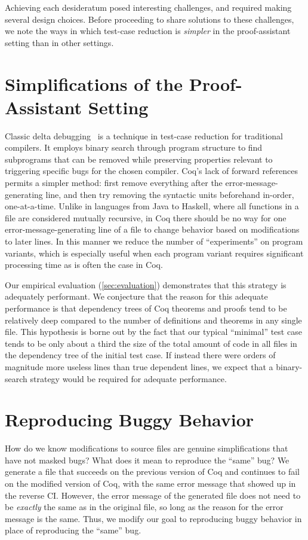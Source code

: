 \documentclass[a4paper,USenglish,cleveref,autoref,thm-restate]{lipics-v2021}
\begin{document}
Achieving each desideratum posed interesting challenges, and required making several design choices.
Before proceeding to share solutions to these challenges, we note the ways in which test-case reduction is \emph{simpler} in the proof-assistant setting than in other settings.


\section{Simplifications of the Proof-Assistant Setting}\label{sec:easier}

Classic delta debugging~\cite{Zeller2002} is a technique in test-case reduction for traditional compilers.
It employs binary search through program structure to find subprograms that can be removed while preserving properties relevant to triggering specific bugs for the chosen compiler.
Coq's lack of forward references permits a simpler method: first remove everything after the error-message-generating line, and then try removing the syntactic units beforehand in-order, one-at-a-time.
Unlike in languages from Java to Haskell, where all functions in a file are considered mutually recursive, in Coq there should be no way for one error-message-generating line of a file to change behavior based on modifications to later lines.
In this manner we reduce the number of ``experiments'' on program variants, which is especially useful when each program variant requires significant processing time as is often the case in Coq.

Our empirical evaluation (\autoref{sec:evaluation}) demonstrates that this strategy is adequately performant.
We conjecture that the reason for this adequate performance is that dependency trees of Coq theorems and proofs tend to be relatively deep compared to the number of definitions and theorems in any single file.
This hypothesis is borne out by the fact that our typical ``minimal'' test case tends to be only about a third the size of the total amount of code in all files in the dependency tree of the initial test case.
If instead there were orders of magnitude more useless lines than true dependent lines, we expect that a binary-search strategy would be required for adequate performance.

\section{Reproducing Buggy Behavior}\label{sec:error-messages}

How do we know modifications to source files are genuine simplifications that have not masked bugs?
What does it mean to reproduce the ``same'' bug?
We generate a file that succeeds on the previous version of Coq and continues to fail on the modified version of Coq, with the same error message that showed up in the reverse CI.
However, the error message of the generated file does not need to be \emph{exactly} the same as in the original file, so long as the reason for the error message is the same.
Thus, we modify our goal to reproducing buggy behavior in place of reproducing the ``same'' bug.
\end{document}
